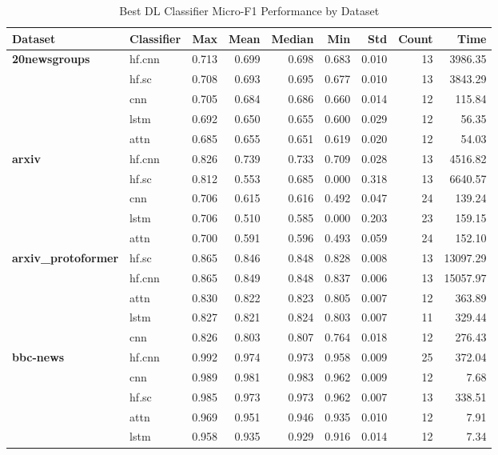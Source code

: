 \documentclass[final]{clv2025}
\begin{document}
\begin{table}[h!]
\centering
\scriptsize
\caption{Best DL Classifier Micro-F1 Performance by Dataset}
\label{tab:dl_classifier_micro_f1}
\begin{tabular}{@{}p{2cm}p{1.2cm}rrrrrrr@{}}
\toprule
\textbf{Dataset} & \textbf{Classifier} & \textbf{Max} & \textbf{Mean} & \textbf{Median} & \textbf{Min} & \textbf{Std} & \textbf{Count} & \textbf{Time} \\
\midrule
\textbf{20newsgroups} & hf.cnn & 0.713 & 0.699 & 0.698 & 0.683 & 0.010 & 13 & 3986.35 \\
 & hf.sc & 0.708 & 0.693 & 0.695 & 0.677 & 0.010 & 13 & 3843.29 \\
 & cnn & 0.705 & 0.684 & 0.686 & 0.660 & 0.014 & 12 & 115.84 \\
 & lstm & 0.692 & 0.650 & 0.655 & 0.600 & 0.029 & 12 & 56.35 \\
 & attn & 0.685 & 0.655 & 0.651 & 0.619 & 0.020 & 12 & 54.03 \\
\midrule
\textbf{arxiv} & hf.cnn & 0.826 & 0.739 & 0.733 & 0.709 & 0.028 & 13 & 4516.82 \\
 & hf.sc & 0.812 & 0.553 & 0.685 & 0.000 & 0.318 & 13 & 6640.57 \\
 & cnn & 0.706 & 0.615 & 0.616 & 0.492 & 0.047 & 24 & 139.24 \\
 & lstm & 0.706 & 0.510 & 0.585 & 0.000 & 0.203 & 23 & 159.15 \\
 & attn & 0.700 & 0.591 & 0.596 & 0.493 & 0.059 & 24 & 152.10 \\
\midrule
\textbf{arxiv\_protoformer} & hf.sc & 0.865 & 0.846 & 0.848 & 0.828 & 0.008 & 13 & 13097.29 \\
 & hf.cnn & 0.865 & 0.849 & 0.848 & 0.837 & 0.006 & 13 & 15057.97 \\
 & attn & 0.830 & 0.822 & 0.823 & 0.805 & 0.007 & 12 & 363.89 \\
 & lstm & 0.827 & 0.821 & 0.824 & 0.803 & 0.007 & 11 & 329.44 \\
 & cnn & 0.826 & 0.803 & 0.807 & 0.764 & 0.018 & 12 & 276.43 \\
\midrule
\textbf{bbc-news} & hf.cnn & 0.992 & 0.974 & 0.973 & 0.958 & 0.009 & 25 & 372.04 \\
 & cnn & 0.989 & 0.981 & 0.983 & 0.962 & 0.009 & 12 & 7.68 \\
 & hf.sc & 0.985 & 0.973 & 0.973 & 0.962 & 0.007 & 13 & 338.51 \\
 & attn & 0.969 & 0.951 & 0.946 & 0.935 & 0.010 & 12 & 7.91 \\
 & lstm & 0.958 & 0.935 & 0.929 & 0.916 & 0.014 & 12 & 7.34 \\

\end{tabular}
\end{table}
\end{document}
